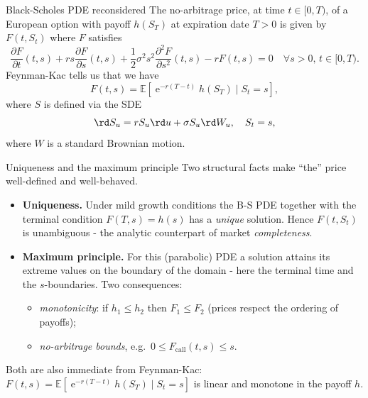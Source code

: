 \documentclass[pdf, handout]{beamer}
\newcommand{\e}{\operatorname{e}}
\begin{document}
\begin{frame}{Black-Scholes PDE reconsidered}
The no-arbitrage price, at time $t\in [0,T)$, of a European option with payoff $h(S_T)$ at expiration date $T>0$ is given by
$F(t, S_t)$ where $F$ satisfies
\[
\frac{\partial F}{\partial t}(t,s) + r s \frac{\partial F}{\partial
s}(t,s) + \frac{1}{2}\sigma^2 s^2 \frac{\partial^2 F}{\partial
s^2}(t,s) -r F(t,s)=0\quad \forall s>0,\,t\in[0, T).
\]
Feynman-Kac tells us that we have
\[
F(t, s)= \mathbb{E}\left[ \e^{-r(T-t)}
 h( S_T)
\mid S_t=s
\right],
\]
where $S$ is defined via the SDE
\[
\rd S_u = r S_u \rd u + \sigma S_u \rd W_u, \quad S_t=s,
\]
where $W$ is a standard Brownian motion.
\end{frame}

\begin{frame}{Uniqueness and the maximum principle}
Two structural facts make ``the'' price well-defined and well-behaved.
\begin{itemize}
\item \textbf{Uniqueness.} Under mild growth conditions the B-S PDE together with the terminal condition $F(T,s)=h(s)$ has a \emph{unique} solution. Hence $F(t,S_t)$ is unambiguous - the analytic counterpart of market \emph{completeness}.
\item \textbf{Maximum principle.} For this (parabolic) PDE a solution attains its extreme values on the boundary of the domain - here the terminal time and the $s$-boundaries. Two consequences:
\begin{itemize}
\item \emph{monotonicity}: if $h_1\le h_2$ then $F_1\le F_2$ (prices respect the ordering of payoffs);
\item \emph{no-arbitrage bounds}, e.g.\ $0\le F_{\text{call}}(t,s)\le s$.
\end{itemize}
\end{itemize}
Both are also immediate from Feynman-Kac: $F(t,s)=\mathbb{E}[\e^{-r(T-t)}h(S_T)\mid S_t=s]$ is linear and monotone in the payoff $h$.
\end{frame}
\end{document}
